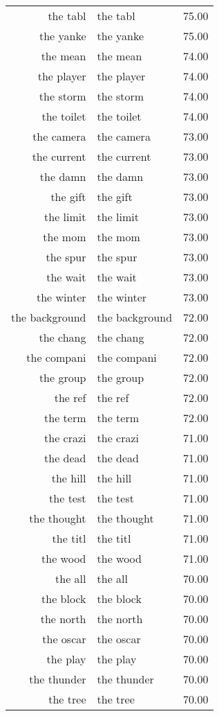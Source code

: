 \begin{table}[ht]
\begin{tabular}{rlr}
  the tabl & the tabl & 75.00 \\ 
  the yanke & the yanke & 75.00 \\ 
  the mean & the mean & 74.00 \\ 
  the player & the player & 74.00 \\ 
  the storm & the storm & 74.00 \\ 
  the toilet & the toilet & 74.00 \\ 
  the camera & the camera & 73.00 \\ 
  the current & the current & 73.00 \\ 
  the damn & the damn & 73.00 \\ 
  the gift & the gift & 73.00 \\ 
  the limit & the limit & 73.00 \\ 
  the mom & the mom & 73.00 \\ 
  the spur & the spur & 73.00 \\ 
  the wait & the wait & 73.00 \\ 
  the winter & the winter & 73.00 \\ 
  the background & the background & 72.00 \\ 
  the chang & the chang & 72.00 \\ 
  the compani & the compani & 72.00 \\ 
  the group & the group & 72.00 \\ 
  the ref & the ref & 72.00 \\ 
  the term & the term & 72.00 \\ 
  the crazi & the crazi & 71.00 \\ 
  the dead & the dead & 71.00 \\ 
  the hill & the hill & 71.00 \\ 
  the test & the test & 71.00 \\ 
  the thought & the thought & 71.00 \\ 
  the titl & the titl & 71.00 \\ 
  the wood & the wood & 71.00 \\ 
  the all & the all & 70.00 \\ 
  the block & the block & 70.00 \\ 
  the north & the north & 70.00 \\ 
  the oscar & the oscar & 70.00 \\ 
  the play & the play & 70.00 \\ 
  the thunder & the thunder & 70.00 \\ 
  the tree & the tree & 70.00 \\ 

\end{tabular}
\end{table}
